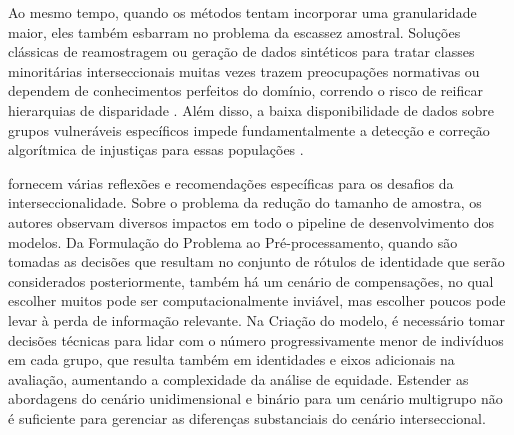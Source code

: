 Ao mesmo tempo, quando os métodos tentam incorporar uma granularidade maior, eles também esbarram no problema da escassez amostral. Soluções clássicas de reamostragem ou geração de dados sintéticos para tratar classes minoritárias interseccionais muitas vezes trazem preocupações normativas ou dependem de conhecimentos perfeitos do domínio, correndo o risco de reificar hierarquias de disparidade \cite{wang2022towards}. Além disso, a baixa disponibilidade de dados sobre grupos vulneráveis específicos impede fundamentalmente a detecção e correção algorítmica de injustiças para essas populações \cite{delaney2024oxonfair}.

\citet{wang2022towards} fornecem várias reflexões e recomendações específicas para os desafios da interseccionalidade. Sobre o problema da redução do tamanho de amostra, os autores observam diversos impactos em todo o pipeline de desenvolvimento dos modelos. Da Formulação do Problema ao Pré-processamento, quando são tomadas as decisões que resultam no conjunto de rótulos de identidade que serão considerados posteriormente, também há um cenário de compensações, no qual escolher muitos pode ser  computacionalmente inviável, mas escolher poucos pode levar à perda de informação relevante. Na Criação do modelo, é necessário tomar decisões técnicas para lidar com o número progressivamente menor de indivíduos em cada grupo, que resulta também em identidades e eixos adicionais na avaliação, aumentando a complexidade da análise de equidade. Estender as abordagens do cenário unidimensional e binário para um cenário multigrupo não é suficiente para gerenciar as diferenças substanciais do cenário interseccional.


